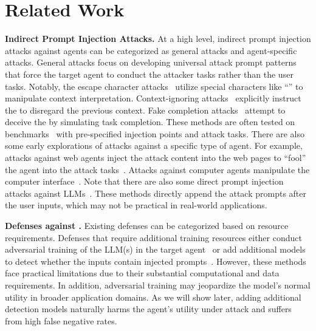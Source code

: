 \section{Related Work}
\label{sec:rw}

\textbf{Indirect Prompt Injection Attacks.}
At a high level, indirect prompt injection attacks against agents can be categorized as general attacks and agent-specific attacks.
General attacks focus on developing universal attack prompt patterns that force the target agent to conduct the attacker tasks rather than the user tasks.
Notably, the escape character attacks~\cite{pi_against_gpt3} utilize special characters like ``'' to manipulate context interpretation.
Context-ignoring attacks~\cite{ignore_previous_prompt, schulhoff2023ignore} explicitly instruct the \llm to disregard the previous context.
Fake completion attacks~\cite{delimiters_url} attempt to deceive the \llm by simulating task completion. 
These methods are often tested on \ipi benchmarks~\cite{debenedetti2024agentdojo,xu2024advweb} with pre-specified injection points and attack tasks.
There are also some early explorations of \llm attacks against a specific type of agent.
For example, attacks against web agents inject the attack content into the web pages to ``fool'' the agent into the attack tasks~\cite{wu2024agentattack,liao2024eia,xu2024advweb}. 
Attacks against computer agents manipulate the computer interface~\cite{zhang2024attacking}. 
Note that there are also some direct prompt injection attacks against LLMs~\cite{yu2023assessing, wu2024agentattack, wu2024new, toyer2024tensor}.
These methods directly append the attack prompts after the user inputs, which may not be practical in real-world applications.

\textbf{Defenses against \ipi.}
Existing defenses can be categorized based on resource requirements.
Defenses that require additional training resources either conduct adversarial training of the LLM(s) in the target agent~\cite{wallace2024instruction, chen2024struq, chen2024aligning} or add additional models to detect whether the inputs contain injected prompts~\cite{deberta-v3-base-prompt-injection-v2, inan2023llama}. 
However, these methods face practical limitations due to their substantial computational and data requirements.
In addition, adversarial training may jeopardize the model's normal utility in broader application domains.
As we will show later, adding additional detection models naturally harms the agent's utility under attack and suffers from high false negative rates.

